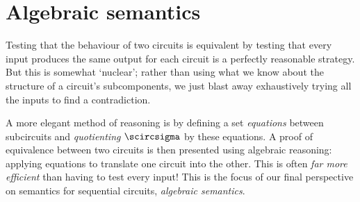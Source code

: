 \chapter{Algebraic semantics}

Testing that the behaviour of two circuits is equivalent by testing that every
input produces the same output for each circuit is a perfectly reasonable
strategy.
But this is somewhat `nuclear'; rather than using what we know
about the structure of a circuit's subcomponents, we just blast away
exhaustively trying all the inputs to find a contradiction.

A more elegant method of reasoning is by defining a set \emph{equations} between
subcircuits and \emph{quotienting} \(\scircsigma\) by these equations.
A proof of equivalence between two circuits is then presented using algebraic
reasoning: applying equations to translate one circuit into the other.
This is often \emph{far more efficient} than having to test every input!
This is the focus of our final perspective on semantics for sequential
circuits, \emph{algebraic semantics}.

